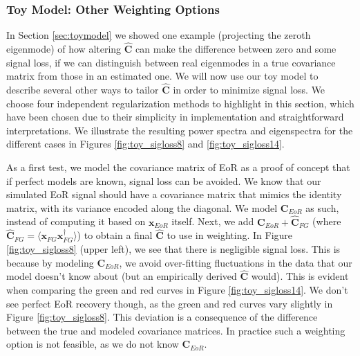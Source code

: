 \documentclass[preprint2,numberedappendix,tighten]{aastex6}  %
\begin{document}
\subsubsection{Toy Model: Other Weighting Options}
\label{sec:otherweight}

In Section \ref{sec:toymodel} we showed one example (projecting the zeroth eigenmode) of how altering $\hat{\textbf{C}}$ can 
make the difference between zero and some signal loss, if we can distinguish between real eigenmodes in a true covariance 
matrix from those in an estimated one. We will now use our toy model to describe several other ways to tailor $\hat{\textbf{C}}$ 
in order to minimize signal loss. We choose four independent regularization methods to highlight in this section, which have 
been chosen due to their simplicity in implementation and straightforward interpretations. We illustrate the resulting power 
spectra and eigenspectra for the different cases in Figures \ref{fig:toy_sigloss8} and \ref{fig:toy_sigloss14}.

As a first test, we model the covariance matrix of EoR as a proof of concept that if perfect models are known, signal loss can be 
avoided. We know that our simulated EoR signal should have a covariance matrix that mimics the identity matrix, with its 
variance encoded along the diagonal. We model $\textbf{C}_{EoR}$ as such, instead of computing it based on $\textbf{x}
_{EoR}$ itself. Next, we add $\textbf{C}_{EoR} + \hat{\textbf{C}}_{FG}$ (where $\hat{\textbf{C}}_{FG} = \langle\textbf{x}_{FG}
\textbf{x}_{FG}^{\dagger}\rangle$) to obtain a final $\hat{\textbf{C}}$ to use in weighting. In Figure \ref{fig:toy_sigloss8} (upper 
left), we see that there is negligible signal loss. This is because by modeling $\textbf{C}_{EoR}$, we avoid over-fitting 
fluctuations in the data that our model doesn't know about (but an empirically derived $\hat{\textbf{C}}$ would). This is evident 
when comparing the green and red curves in Figure \ref{fig:toy_sigloss14}. We don't see perfect EoR recovery though, as the 
green and red curves vary slightly in Figure \ref{fig:toy_sigloss8}. This deviation is a consequence of the difference between the 
true and modeled covariance matrices. In practice such a weighting option is not feasible, as we do not know $\textbf{C}_{EoR}
$.
\end{document}
